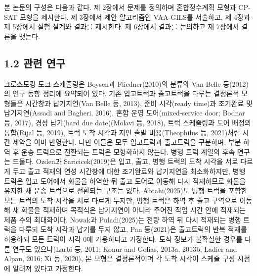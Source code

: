 \documentclass[10pt,a4paper]{article}
\begin{document}
본 논문의 구성은 다음과 같다. 제 2장에서 문제를 정의하며 혼합정수계획 모형과
CP-SAT 모형을 제시한다. 제 3장에서 제안 알고리즘인 VAA-GILS를 서술하고, 제 4장과
제 5장에서 실험 설계와 결과를 제시한다. 제 6장에서 결과를 논의하고 제 7장에서
결론을 맺는다.

\subsection{1.2 관련 연구}
크로스도킹 도크 스케줄링은 Boysen과 Fliedner(2010)의 분류와 Van Belle 등(2012)의
연구 동향 정리에 요약되어 있다. 기존 입고트럭과 출고트럭을 다루는 결정론적 모형들은 시간창과 납기지연(Van Belle 등, 2013),
준비 시각(ready time)과 조기완료 및 납기지연(Assadi and Bagheri, 2016), 혼합 운영 도어(mixed-service door; Bodnar 등, 2017),
경성 납기(hard due date)(Molavi 등, 2018), 트럭 스케줄링과 도어 배정의 통합(Rijal 등, 2019),
트럭 도착 시각과 지연 출발 비용(Theophilus 등, 2021)처럼 시간 제약을 이미 반영한다. 다만 이들은 모두
입고트럭과 출고트럭을 구분하며, 부분 하역 후 운송 트럭으로 전환되는 트럭은 모형화하지 않는다.
병행 트럭 계열의 후속 연구는 드물다. Ozden과 Saricicek(2019)은 입고, 출고, 병행 트럭의 도착 시각을 서로 다르게 두고
출고 적재의 연성 시간창에 대한 조기완료와 납기지연을 최소화하지만, 병행 트럭은 입고 도어에서 화물을 하역한 뒤 출고 도어로
이동해 다시 적재하므로 화물을 유지한 채 운송 트럭으로 전환되는 구조는 없다. Abtahi(2025)도 병행 트럭을 포함한
모든 트럭의 도착 시각을 서로 다르게 두지만, 병행 트럭은 하역 후 출고 구역으로 이동해 새 화물을 적재하며 목적식은
납기지연이 아니라 주어진 작업 시간 안에 적재되는 제품 수의 최대화이다. Nowak과 Puladi(2025)는 전량 하역 뒤 다시 적재되는 병행 트럭을 다루되
도착 시각과 납기를 두지 않고, Pan 등(2021)은 출고트럭의 반복 적재를 허용하되 모든 트럭이 시각 0에
가용하다고 가정한다. 도착 정보가 불확실한 경우를 다룬 연구도 있으나(Larbi 등, 2011; Konur and Golias,
2013a, 2013b; Ladier and Alpan, 2016; Xi 등, 2020), 본 모형은 결정론적이며 각 도착 시각이 스케줄 구성
시점에 알려져 있다고 가정한다.
\end{document}
